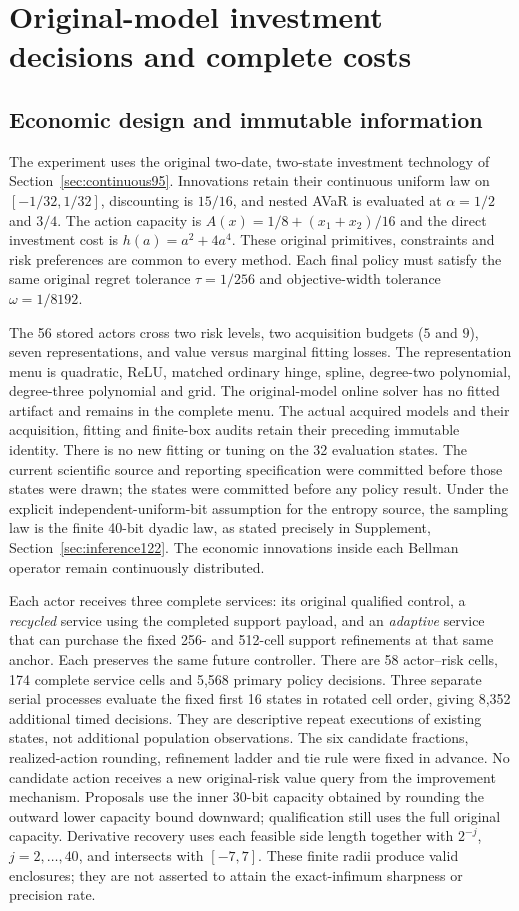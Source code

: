 \section{Original-model investment decisions and complete costs}
\label{sec:numerical122}
\subsection{Economic design and immutable information}
The experiment uses the original two-date, two-state investment technology of
Section~\ref{sec:continuous95}. Innovations retain their continuous uniform law
on $[-1/32,1/32]$, discounting is $15/16$, and nested AVaR is evaluated at
$\alpha=1/2$ and $3/4$. The action capacity is
$A(x)=1/8+(x_1+x_2)/16$ and the direct investment cost is
$h(a)=a^2+4a^4$. These original primitives, constraints and risk preferences are
common to every method. Each final policy must satisfy the same original regret
tolerance $\tau=1/256$ and objective-width tolerance $\omega=1/8192$.

The 56 stored actors cross two risk levels, two acquisition budgets
($5$ and $9$), seven representations, and value versus marginal fitting losses.
The representation menu is quadratic, ReLU, matched ordinary hinge, spline,
degree-two polynomial, degree-three polynomial and grid. The original-model
online solver has no fitted artifact and remains in the complete menu. The
actual acquired models and their acquisition, fitting and finite-box audits
retain their preceding immutable identity. There is no new fitting or tuning
on the 32 evaluation states. The current scientific source and reporting
specification were committed before those states were drawn; the states were
committed before any policy result. Under the explicit independent-uniform-bit assumption for the entropy source,
the sampling law is the finite 40-bit dyadic law, as stated
precisely in Supplement, Section~\ref{sec:inference122}. The economic innovations
inside each Bellman operator remain continuously distributed.

Each actor receives three complete services: its original qualified control,
a \emph{recycled} service using the completed support payload, and an
\emph{adaptive} service that can purchase the fixed 256- and 512-cell support
refinements at that same anchor. Each preserves the same future controller.
There are 58 actor--risk cells, 174 complete service cells and 5,568 primary
policy decisions. Three separate serial processes evaluate the fixed first
16 states in rotated cell order, giving 8,352 additional timed decisions.
They are descriptive repeat executions of existing states, not additional
population observations. The six candidate fractions, realized-action rounding,
refinement ladder and tie rule were fixed in advance. No candidate action
receives a new original-risk value query from the improvement mechanism.
Proposals use the inner 30-bit capacity obtained by rounding the outward lower
capacity bound downward; qualification still uses the full original capacity.
Derivative recovery uses each feasible side length together with
$2^{-j}$, $j=2,\ldots,40$, and intersects with $[-7,7]$. These finite radii
produce valid enclosures; they are not asserted to attain the exact-infimum
sharpness or precision rate.

